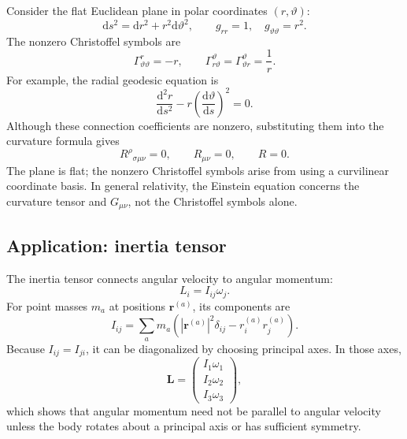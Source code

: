 \begin{example}
Consider the flat Euclidean plane in polar coordinates $(r,\vartheta)$:
\begin{equation}
\mathrm{d}s^2=\mathrm{d}r^2+r^2\mathrm{d}\vartheta^2,
\qquad
g_{rr}=1,\quad g_{\vartheta\vartheta}=r^2.
\end{equation}
The nonzero Christoffel symbols are
\begin{equation}
\Gamma^r_{\vartheta\vartheta}=-r,
\qquad
\Gamma^\vartheta_{r\vartheta}
=\Gamma^\vartheta_{\vartheta r}=\frac1r.
\end{equation}
For example, the radial geodesic equation is
\begin{equation}
\frac{\mathrm{d}^2r}{\mathrm{d}s^2}
-r\left(\frac{\mathrm{d}\vartheta}{\mathrm{d}s}\right)^2=0.
\end{equation}
Although these connection coefficients are nonzero, substituting them into the curvature formula gives
\begin{equation}
R^\rho{}_{\sigma\mu\nu}=0,
\qquad
R_{\mu\nu}=0,
\qquad
R=0.
\end{equation}
The plane is flat; the nonzero Christoffel symbols arise from using a curvilinear coordinate basis. In general relativity, the Einstein equation concerns the curvature tensor and $G_{\mu\nu}$, not the Christoffel symbols alone.
\end{example}

\subsection{Application: inertia tensor}
The inertia tensor connects angular velocity to angular momentum:
\begin{equation}
L_i=I_{ij}\omega_j.
\end{equation}
For point masses $m_a$ at positions $\mathbf{r}^{(a)}$, its components are
\begin{equation}
I_{ij}=\sum_a m_a\left(|\mathbf{r}^{(a)}|^2\delta_{ij}-r^{(a)}_ir^{(a)}_j\right).
\end{equation}
Because $I_{ij}=I_{ji}$, it can be diagonalized by choosing principal axes. In those axes,
\begin{equation}
\mathbf{L}=\begin{pmatrix}I_1\omega_1\\I_2\omega_2\\I_3\omega_3\end{pmatrix},
\end{equation}
which shows that angular momentum need not be parallel to angular velocity unless the body rotates about a principal axis or has sufficient symmetry.

